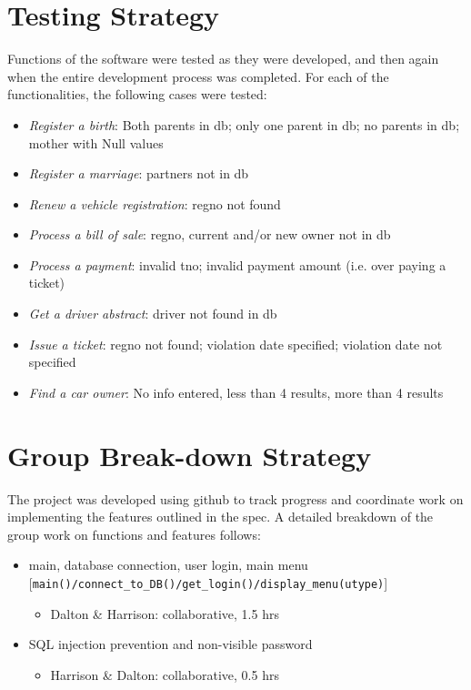 \documentclass[10pt, a4paper]{article}
\begin{document}
{\begin{itemize}
\end{itemize}

\section{Testing Strategy}\label{TS}
Functions of the software were tested as they were developed, and then again when the entire development process was completed. For each of the functionalities, the following cases were tested:
\begin{itemize}
\item{\emph{Register a birth}: Both parents in db; only one parent in db; no parents in db; mother with Null values}
\item{\emph{Register a marriage}: partners not in db}
\item{\emph{Renew a vehicle registration}: regno not found}
\item{\emph{Process a bill of sale}: regno, current and/or new owner not in db}
\item{\emph{Process a payment}: invalid tno; invalid payment amount (i.e. over paying a ticket)}
\item{\emph{Get a driver abstract}: driver not found in db}
\item{\emph{Issue a ticket}: regno not found; violation date specified; violation date not specified }
\item{\emph{Find a car owner}: No info entered, less than 4 results, more than 4 results}
\end{itemize}

\section{Group Break-down Strategy}\label{GS}
The project was developed using github to track progress and coordinate work on implementing the features outlined in the spec. A detailed breakdown of the group work on functions and features follows: 
	
	\begin{itemize}
	\item main, database connection, user login, main menu [\texttt{main()/connect\_to\_DB()/get\_login()/display\_menu(utype)}]
		\begin{itemize}
		\item Dalton \& Harrison: collaborative, 1.5 hrs
		\end{itemize}
		
	\item SQL injection prevention and non-visible password
		\begin{itemize}
		\item Harrison \& Dalton: collaborative, 0.5 hrs
		\end{itemize}
	

\end{itemize}}
\end{document}
